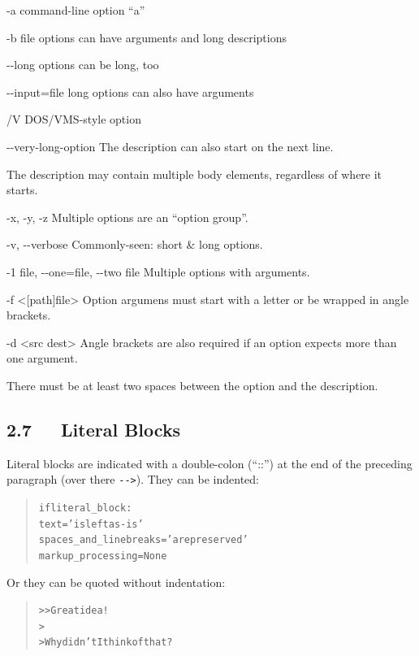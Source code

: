 \documentclass[a4paper]{article}
\providecommand*{\DUoptionlistlabel}[1]{\bfseries #1 \hfill}
\newenvironment{DUoptionlist}{%
    \list{}{\setlength{\labelwidth}{\DUoptionlistindent}
            \setlength{\rightmargin}{1cm}
            \setlength{\leftmargin}{\rightmargin}
            \addtolength{\leftmargin}{\labelwidth}
            \addtolength{\leftmargin}{\labelsep}
            \renewcommand{\makelabel}{\DUoptionlistlabel}}
  }
  {\endlist}
\begin{document}
\begin{DUoptionlist}
\item[-a]  command-line option “a”
\item[-b file]  options can have arguments
and long descriptions
\item[-{}-long]  options can be long, too
\item[-{}-input=file]  long options can also have arguments
\item[/V]  DOS/VMS-style option
\item[-{}-very-long-option]  The description can also start on the next line.

The description may contain multiple body elements,
regardless of where it starts.
\item[-x, -y, -z]  Multiple options are an “option group”.
\item[-v, -{}-verbose]  Commonly-seen: short \& long options.
\item[-1 file, -{}-one=file, -{}-two file]  Multiple options with arguments.
\item[-f <{[}path{]}file>]  Option argumens must start with a letter
or be wrapped in angle brackets.
\item[-d <src dest>]  Angle brackets are also required if an
option expects more than one argument.
\end{DUoptionlist}

There must be at least two spaces between the option and the
description.


\subsection{2.7   Literal Blocks}

Literal blocks are indicated with a double-colon (“::”) at the end of
the preceding paragraph (over there \texttt{-{}->}).  They can be indented:

\begin{quote}
\begin{alltt}
if literal_block:
    text = 'is left as-is'
    spaces_and_linebreaks = 'are preserved'
    markup_processing = None
\end{alltt}
\end{quote}

Or they can be quoted without indentation:

\begin{quote}
\begin{alltt}
>> Great idea!
>
> Why didn't I think of that?
\end{alltt}
\end{quote}
\end{document}
